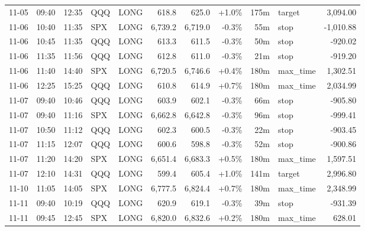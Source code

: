\documentclass[11pt,a4paper,twoside]{article}
\begin{document}
\begin{center}
\begin{longtable}{>{\color{txtmain}}l l l l l r r r r >{\color{txtmain}}l r}
11-05 & 09:40 & 12:35 & QQQ & LONG & 618.8 & 625.0 & \textcolor{wingreen}{+1.0\%} & 175m & target & \textcolor{wingreen}{3,094.00} \\
11-06 & 10:40 & 11:35 & SPX & LONG & 6,739.2 & 6,719.0 & \textcolor{lossred}{-0.3\%} & 55m & stop & \textcolor{lossred}{-1,010.88} \\
11-06 & 10:45 & 11:35 & QQQ & LONG & 613.3 & 611.5 & \textcolor{lossred}{-0.3\%} & 50m & stop & \textcolor{lossred}{-920.02} \\
11-06 & 11:35 & 11:56 & QQQ & LONG & 612.8 & 611.0 & \textcolor{lossred}{-0.3\%} & 21m & stop & \textcolor{lossred}{-919.20} \\
11-06 & 11:40 & 14:40 & SPX & LONG & 6,720.5 & 6,746.6 & \textcolor{wingreen}{+0.4\%} & 180m & max\_time & \textcolor{wingreen}{1,302.51} \\
11-06 & 12:25 & 15:25 & QQQ & LONG & 610.8 & 614.9 & \textcolor{wingreen}{+0.7\%} & 180m & max\_time & \textcolor{wingreen}{2,034.99} \\
11-07 & 09:40 & 10:46 & QQQ & LONG & 603.9 & 602.1 & \textcolor{lossred}{-0.3\%} & 66m & stop & \textcolor{lossred}{-905.80} \\
11-07 & 09:40 & 11:16 & SPX & LONG & 6,662.8 & 6,642.8 & \textcolor{lossred}{-0.3\%} & 96m & stop & \textcolor{lossred}{-999.41} \\
11-07 & 10:50 & 11:12 & QQQ & LONG & 602.3 & 600.5 & \textcolor{lossred}{-0.3\%} & 22m & stop & \textcolor{lossred}{-903.45} \\
11-07 & 11:15 & 12:07 & QQQ & LONG & 600.6 & 598.8 & \textcolor{lossred}{-0.3\%} & 52m & stop & \textcolor{lossred}{-900.86} \\
11-07 & 11:20 & 14:20 & SPX & LONG & 6,651.4 & 6,683.3 & \textcolor{wingreen}{+0.5\%} & 180m & max\_time & \textcolor{wingreen}{1,597.51} \\
11-07 & 12:10 & 14:31 & QQQ & LONG & 599.4 & 605.4 & \textcolor{wingreen}{+1.0\%} & 141m & target & \textcolor{wingreen}{2,996.80} \\
11-10 & 11:05 & 14:05 & SPX & LONG & 6,777.5 & 6,824.4 & \textcolor{wingreen}{+0.7\%} & 180m & max\_time & \textcolor{wingreen}{2,348.99} \\
11-11 & 09:40 & 10:19 & QQQ & LONG & 620.9 & 619.1 & \textcolor{lossred}{-0.3\%} & 39m & stop & \textcolor{lossred}{-931.39} \\
11-11 & 09:45 & 12:45 & SPX & LONG & 6,820.0 & 6,832.6 & \textcolor{wingreen}{+0.2\%} & 180m & max\_time & \textcolor{wingreen}{628.01} \\

\end{longtable}
\end{center}
\end{document}
